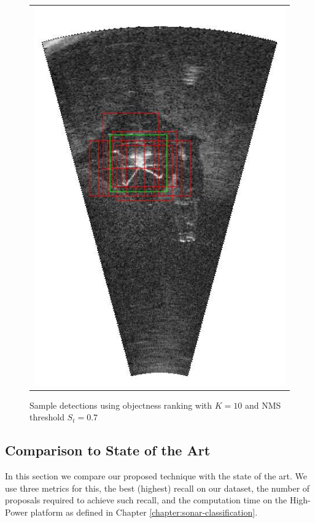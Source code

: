 \begin{figure}[p]
{\begin{tabular}[b]{c}
		\includegraphics[height=0.22\textheight]{chapters/images/proposals/detections/fcn-nms070-2016-02-11_070611-frame16021-topK10-proposals.jpg}
        \end{tabular}
	}	
	\vspace*{-1.0cm}
	\caption{Sample detections using objectness ranking with $K = 10$ and NMS threshold $S_t = 0.7$}
	\label{proposals:rankingDetectionSamples}
\end{figure}

\subsection{Comparison to State of the Art}

In this section we compare our proposed technique with the state of the art. We use three metrics for this, the best (highest) recall on our dataset, the number of proposals required to achieve such recall, and the computation time on the High-Power platform as defined in Chapter \ref{chapter:sonar-classification}. 

